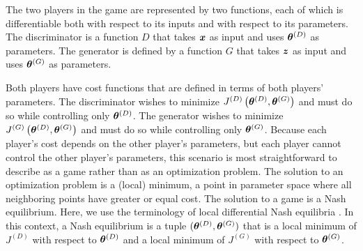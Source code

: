 The two players in the game are represented by two functions, each of which
is differentiable both with respect to its inputs and with respect to its
parameters.
The discriminator is a function $D$ that takes ${\bm{x}}$ as input and uses
${\bm{\theta}}^{(D)}$ as parameters.
The generator is defined by a function $G$ that takes ${\bm{z}}$ as input and
uses ${\bm{\theta}}^{(G)}$ as parameters.

Both players have cost functions that are defined in terms of both players'
parameters.
The discriminator wishes to minimize $J^{(D)}\left( {\bm{\theta}}^{(D)}, {\bm{\theta}}^{(G)} \right)$
and must do so while controlling only ${\bm{\theta}}^{(D)}$.
The generator wishes to minimize $J^{(G)}\left( {\bm{\theta}}^{(D)}, {\bm{\theta}}^{(G)} \right)$
and must do so while controlling only ${\bm{\theta}}^{(G)}$.
Because each player's cost depends on the other player's parameters, but each player
cannot control the other player's parameters, this scenario is most
straightforward to describe as a game rather than as an optimization problem.
The solution to an optimization problem is a (local) minimum, a point in parameter space
where all neighboring points have greater or equal cost.
The solution to a game is a Nash equilibrium.
Here, we use the terminology of local differential Nash equilibria \citep{ratliff2013characterization}.
In this context, a Nash equilibrium is a tuple $({\bm{\theta}}^{(D)}, {\bm{\theta}}^{(G)} )$
that is a local minimum of $J^{(D)}$ with respect to ${\bm{\theta}}^{(D)}$ and a local
minimum of $J^{(G)}$ with respect to ${\bm{\theta}}^{(G)}$.


